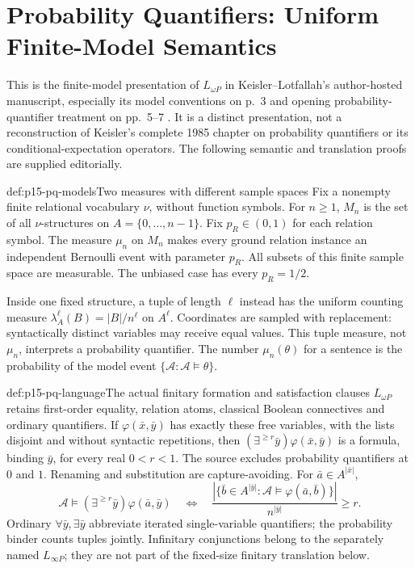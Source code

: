 \chapter{Probability Quantifiers: Uniform Finite-Model Semantics}
\label{sec:p15-probability-quantifiers}

This is the finite-model presentation of \(L_{\omega P}\) in
Keisler--Lotfallah's author-hosted manuscript, especially its model
conventions on p.~3 and opening probability-quantifier treatment on
pp.~5--7 \cite{KeislerLotfallah2009AuthorProbability}. It is a distinct
presentation, not a reconstruction of Keisler's complete 1985 chapter
on probability quantifiers or its conditional-expectation operators.
The following semantic and translation proofs are supplied editorially.

\begin{hbdefinition}{def:p15-pq-models}{Two measures with different sample spaces}
Fix a nonempty finite relational vocabulary \(\nu\), without function
symbols. For \(n\ge1\), \(M_n\) is the set of all \(\nu\)-structures
on \(A=\{0,\ldots,n-1\}\). Fix \(p_R\in(0,1)\) for each relation
symbol. The measure \(\mu_n\) on \(M_n\) makes every ground relation
instance an independent Bernoulli event with parameter \(p_R\).
All subsets of this finite sample space are measurable.
The unbiased case has every \(p_R=1/2\).

Inside one fixed structure, a tuple of length \(\ell\) instead has
the uniform counting measure
\(\lambda_A^\ell(B)=|B|/n^\ell\) on \(A^\ell\).
Coordinates are sampled with replacement: syntactically distinct
variables may receive equal values. This tuple measure, not \(\mu_n\),
interprets a probability quantifier. The number
\(\mu_n(\theta)\) for a sentence is the probability of the model event
\(\{\mathcal A:\mathcal A\models\theta\}\).
\end{hbdefinition}

\begin{hbdefinition}{def:p15-pq-language}{The actual finitary formation and satisfaction clauses}
\(L_{\omega P}\) retains first-order equality, relation atoms, classical
Boolean connectives and ordinary quantifiers. If
\(\varphi(\bar x,\bar y)\) has exactly these free variables, with
the lists disjoint and without syntactic repetitions, then
\((\exists^{\ge r}\bar y)\varphi(\bar x,\bar y)\) is a formula,
binding \(\bar y\), for every real \(0<r<1\).
The source excludes probability quantifiers at \(0\) and \(1\).
Renaming and substitution are capture-avoiding.
For \(\bar a\in A^{|\bar x|}\),
\[
 \mathcal A\models(\exists^{\ge r}\bar y)\varphi(\bar a,\bar y)
 \quad\Longleftrightarrow\quad
 \frac{|\{\bar b\in A^{|\bar y|}:
                 \mathcal A\models\varphi(\bar a,\bar b)\}|}
      {n^{|\bar y|}}\ge r.
\]
Ordinary \(\forall\bar y,\exists\bar y\) abbreviate iterated
single-variable quantifiers; the probability binder counts tuples jointly.
Infinitary conjunctions belong to the separately named \(L_{\infty P}\);
they are not part of the fixed-size finitary translation below.
\end{hbdefinition}


